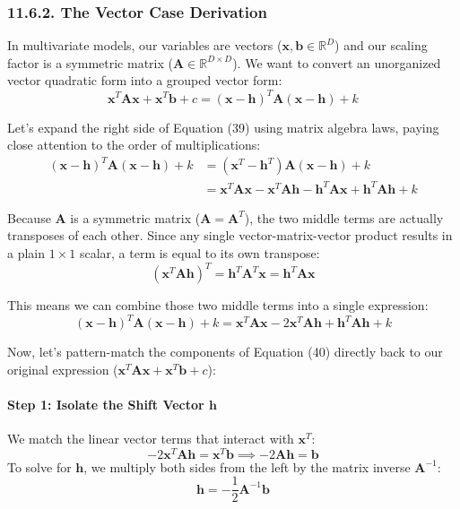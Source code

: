 \documentclass{article}
\begin{document}
\subsubsection*{11.6.2. The Vector Case Derivation}
In multivariate models, our variables are vectors ($\mathbf{x}, \mathbf{b} \in \mathbb{R}^D$) and our scaling factor is a symmetric matrix ($\mathbf{A} \in \mathbb{R}^{D \times D}$). We want to convert an unorganized vector quadratic form into a grouped vector form:
\begin{equation}
\mathbf{x}^T\mathbf{A}\mathbf{x} + \mathbf{x}^T\mathbf{b} + c = (\mathbf{x} - \mathbf{h})^T\mathbf{A}(\mathbf{x} - \mathbf{h}) + k \tag{39}
\end{equation}

Let's expand the right side of Equation (39) using matrix algebra laws, paying close attention to the order of multiplications:
\begin{align*}
(\mathbf{x} - \mathbf{h})^T\mathbf{A}(\mathbf{x} - \mathbf{h}) + k &= (\mathbf{x}^T - \mathbf{h}^T)\mathbf{A}(\mathbf{x} - \mathbf{h}) + k \\
&= \mathbf{x}^T\mathbf{A}\mathbf{x} - \mathbf{x}^T\mathbf{A}\mathbf{h} - \mathbf{h}^T\mathbf{A}\mathbf{x} + \mathbf{h}^T\mathbf{A}\mathbf{h} + k
\end{align*}

Because $\mathbf{A}$ is a symmetric matrix ($\mathbf{A} = \mathbf{A}^T$), the two middle terms are actually transposes of each other. Since any single vector-matrix-vector product results in a plain $1 \times 1$ scalar, a term is equal to its own transpose:
\begin{equation*}
(\mathbf{x}^T\mathbf{A}\mathbf{h})^T = \mathbf{h}^T\mathbf{A}^T\mathbf{x} = \mathbf{h}^T\mathbf{A}\mathbf{x}
\end{equation*}

This means we can combine those two middle terms into a single expression:
\begin{equation}
(\mathbf{x} - \mathbf{h})^T\mathbf{A}(\mathbf{x} - \mathbf{h}) + k = \mathbf{x}^T\mathbf{A}\mathbf{x} - 2\mathbf{x}^T\mathbf{A}\mathbf{h} + \mathbf{h}^T\mathbf{A}\mathbf{h} + k \tag{40}
\end{equation}

Now, let's pattern-match the components of Equation (40) directly back to our original expression ($\mathbf{x}^T\mathbf{A}\mathbf{x} + \mathbf{x}^T\mathbf{b} + c$):

\paragraph{Step 1: Isolate the Shift Vector $\mathbf{h}$}
We match the linear vector terms that interact with $\mathbf{x}^T$:
\begin{equation*}
-2\mathbf{x}^T\mathbf{A}\mathbf{h} = \mathbf{x}^T\mathbf{b} \implies -2\mathbf{A}\mathbf{h} = \mathbf{b}
\end{equation*}
To solve for $\mathbf{h}$, we multiply both sides from the left by the matrix inverse $\mathbf{A}^{-1}$:
\begin{equation}
\mathbf{h} = -\frac{1}{2}\mathbf{A}^{-1}\mathbf{b} \tag{41}
\end{equation}
\end{document}

